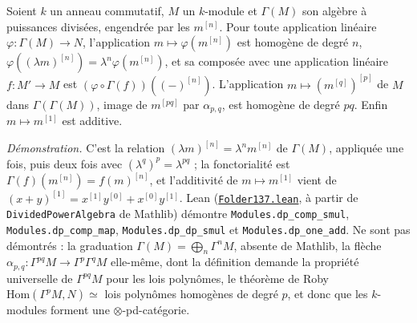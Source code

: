 \begin{encadre}
\begin{theoreme*}
Soient $k$ un anneau commutatif, $M$ un $k$-module et $\Gamma(M)$ son algèbre à puissances divisées, engendrée par les $m^{[n]}$. Pour toute application linéaire $\varphi : \Gamma(M) \to N$, l'application $m \mapsto \varphi(m^{[n]})$ est homogène de degré $n$, $\varphi((\lambda m)^{[n]}) = \lambda^n \varphi(m^{[n]})$, et sa composée avec une application linéaire $f : M' \to M$ est $(\varphi \circ \Gamma(f))((-)^{[n]})$. L'application $m \mapsto (m^{[q]})^{[p]}$ de $M$ dans $\Gamma(\Gamma(M))$, image de $m^{[pq]}$ par $\alpha_{p,q}$, est homogène de degré $pq$. Enfin $m \mapsto m^{[1]}$ est additive.
\end{theoreme*}
\end{encadre}
{\small \emph{Démonstration.} C'est la relation $(\lambda m)^{[n]} = \lambda^n m^{[n]}$ de $\Gamma(M)$, appliquée une fois, puis deux fois avec $(\lambda^q)^p = \lambda^{pq}$ ; la fonctorialité est $\Gamma(f)(m^{[n]}) = f(m)^{[n]}$, et l'additivité de $m \mapsto m^{[1]}$ vient de $(x + y)^{[1]} = x^{[1]} y^{[0]} + x^{[0]} y^{[1]}$. Lean (\href{\leanblob/CategoryTheory/Folder137.lean}{\texttt{Folder137.\allowbreak{}lean}}, à partir de \texttt{DividedPowerAlgebra} de Mathlib) démontre \texttt{Modules.\allowbreak{}dp\_comp\_smul}, \texttt{Modules.\allowbreak{}dp\_comp\_map}, \texttt{Modules.\allowbreak{}dp\_dp\_smul} et \texttt{Modules.\allowbreak{}dp\_one\_add}. Ne sont pas démontrés : la graduation $\Gamma(M) = \bigoplus_n \Gamma^n M$, absente de Mathlib, la flèche $\alpha_{p,q} : \Gamma^{pq} M \to \Gamma^p \Gamma^q M$ elle-même, dont la définition demande la propriété universelle de $\Gamma^{pq} M$ pour les lois polynômes, le théorème de Roby $\mathrm{Hom}(\Gamma^p M, N) \simeq$ lois polynômes homogènes de degré $p$, et donc que les $k$-modules forment une $\otimes$-pd-catégorie.\par}
